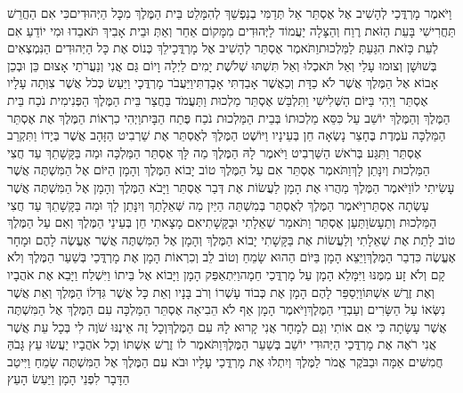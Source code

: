\documentclass[../main/main.tex]{subfiles}
\begin{document}
\begin{multicols}{\ncols}
וַיֹּאמֶר מָרְדֳּכַי לְהָשִׁיב אֶל אֶסְתֵּר אַל תְּדַמִּי בְנַפְשֵׁךְ לְהִמָּלֵט בֵּית הַמֶּלֶךְ מִכָּל הַיְּהוּדִים\PreVerseSpace{}כִּי אִם הַחֲרֵשׁ תַּחֲרִישִׁי בָּעֵת הַזֹּאת רֶוַח וְהַצָּלָה יַעֲמוֹד לַיְּהוּדִים מִמָּקוֹם אַחֵר וְאַתְּ וּבֵית אָבִיךְ תֹּאבֵדוּ וּמִי יוֹדֵעַ אִם לְעֵת כָּזֹאת הִגַּעַתְּ לַמַּלְכוּת\PreVerseSpace{}וַתֹּאמֶר אֶסְתֵּר לְהָשִׁיב אֶל מָרְדֳּכָי\PreVerseSpace{}לֵךְ כְּנוֹס אֶת כָּל הַיְּהוּדִים הַנִּמְצְאִים בְּשׁוּשָׁן וְצוּמוּ עָלַי וְאַל תֹּאכְלוּ וְאַל תִּשְׁתּוּ שְׁלֹשֶׁת יָמִים לַיְלָה וָיוֹם גַּם אֲנִי וְנַעֲרֹתַי אָצוּם כֵּן וּבְכֵן אָבוֹא אֶל הַמֶּלֶךְ אֲשֶׁר לֹא כַדָּת וְכַאֲשֶׁר אָבַדְתִּי אָבָדְתִּי\PreVerseSpace{}וַיַּעֲבֹר מָרְדֳּכָי וַיַּעַשׂ כְּכֹל אֲשֶׁר צִוְּתָה עָלָיו אֶסְתֵּר \ClosedSection{}וַיְהִי בַּיּוֹם הַשְּׁלִישִׁי וַתִּלְבַּשׁ אֶסְתֵּר מַלְכוּת וַתַּעֲמֹד בַּחֲצַר בֵּית הַמֶּלֶךְ הַפְּנִימִית נֹכַח בֵּית הַמֶּלֶךְ וְהַמֶּלֶךְ יוֹשֵׁב עַל כִּסֵּא מַלְכוּתוֹ בְּבֵית הַמַּלְכוּת נֹכַח פֶּתַח הַבָּיִת\PreVerseSpace{}וַיְהִי כִרְאוֹת הַמֶּלֶךְ אֶת אֶסְתֵּר הַמַּלְכָּה עֹמֶדֶת בֶּחָצֵר נָשְׂאָה חֵן בְּעֵינָיו וַיּוֹשֶׁט הַמֶּלֶךְ לְאֶסְתֵּר אֶת שַׁרְבִיט הַזָּהָב אֲשֶׁר בְּיָדוֹ וַתִּקְרַב אֶסְתֵּר וַתִּגַּע בְּרֹאשׁ הַשַּׁרְבִיט \ClosedSection{}וַיֹּאמֶר לָהּ הַמֶּלֶךְ מַה לָּךְ אֶסְתֵּר הַמַּלְכָּה וּמַה בַּקָּשָׁתֵךְ עַד חֲצִי הַמַּלְכוּת וְיִנָּתֵן לָךְ\PreVerseSpace{}וַתֹּאמֶר אֶסְתֵּר אִם עַל הַמֶּלֶךְ טוֹב יָבוֹא הַמֶּלֶךְ וְהָמָן הַיּוֹם אֶל הַמִּשְׁתֶּה אֲשֶׁר עָשִׂיתִי לוֹ\PreVerseSpace{}וַיֹּאמֶר הַמֶּלֶךְ מַהֲרוּ אֶת הָמָן לַעֲשׂוֹת אֶת דְּבַר אֶסְתֵּר וַיָּבֹא הַמֶּלֶךְ וְהָמָן אֶל הַמִּשְׁתֶּה אֲשֶׁר עָשְׂתָה אֶסְתֵּר\PreVerseSpace{}וַיֹּאמֶר הַמֶּלֶךְ לְאֶסְתֵּר בְּמִשְׁתֵּה הַיַּיִן מַה שְּׁאֵלָתֵךְ וְיִנָּתֵן לָךְ וּמַה בַּקָּשָׁתֵךְ עַד חֲצִי הַמַּלְכוּת וְתֵעָשׂ\PreVerseSpace{}וַתַּעַן אֶסְתֵּר וַתֹּאמַר שְׁאֵלָתִי וּבַקָּשָׁתִי\PreVerseSpace{}אִם מָצָאתִי חֵן בְּעֵינֵי הַמֶּלֶךְ וְאִם עַל הַמֶּלֶךְ טוֹב לָתֵת אֶת שְׁאֵלָתִי וְלַעֲשׂוֹת אֶת בַּקָּשָׁתִי יָבוֹא הַמֶּלֶךְ וְהָמָן אֶל הַמִּשְׁתֶּה אֲשֶׁר אֶעֱשֶׂה לָהֶם וּמָחָר אֶעֱשֶׂה כִּדְבַר הַמֶּלֶךְ\PreVerseSpace{}וַיֵּצֵא הָמָן בַּיּוֹם הַהוּא שָׂמֵחַ וְטוֹב לֵב וְכִרְאוֹת הָמָן אֶת מָרְדֳּכַי בְּשַׁעַר הַמֶּלֶךְ וְלֹא קָם וְלֹא זָע מִמֶּנּוּ וַיִּמָּלֵא הָמָן עַל מָרְדֳּכַי חֵמָה\PreVerseSpace{}וַיִּתְאַפַּק הָמָן וַיָּבוֹא אֶל בֵּיתוֹ וַיִּשְׁלַח וַיָּבֵא אֶת אֹהֲבָיו וְאֶת זֶרֶשׁ אִשְׁתּוֹ\PreVerseSpace{}וַיְסַפֵּר לָהֶם הָמָן אֶת כְּבוֹד עָשְׁרוֹ וְרֹב בָּנָיו וְאֵת כָּל אֲשֶׁר גִּדְּלוֹ הַמֶּלֶךְ וְאֵת אֲשֶׁר נִשְּׂאוֹ עַל הַשָּׂרִים וְעַבְדֵי הַמֶּלֶךְ\PreVerseSpace{}וַיֹּאמֶר הָמָן אַף לֹא הֵבִיאָה אֶסְתֵּר הַמַּלְכָּה עִם הַמֶּלֶךְ אֶל הַמִּשְׁתֶּה אֲשֶׁר עָשָׂתָה כִּי אִם אוֹתִי וְגַם לְמָחָר אֲנִי קָרוּא לָהּ עִם הַמֶּלֶךְ\PreVerseSpace{}וְכָל זֶה אֵינֶנּוּ שֹׁוֶה לִי בְּכָל עֵת אֲשֶׁר אֲנִי רֹאֶה אֶת מָרְדֳּכַי הַיְּהוּדִי יוֹשֵׁב בְּשַׁעַר הַמֶּלֶךְ\PreVerseSpace{}וַתֹּאמֶר לוֹ זֶרֶשׁ אִשְׁתּוֹ וְכָל אֹהֲבָיו יַעֲשׂוּ עֵץ גָּבֹהַּ חֲמִשִּׁים אַמָּה וּבַבֹּקֶר אֱמֹר לַמֶּלֶךְ וְיִתְלוּ אֶת מָרְדֳּכַי עָלָיו וּבֹא עִם הַמֶּלֶךְ אֶל הַמִּשְׁתֶּה שָׂמֵחַ וַיִּיטַב הַדָּבָר לִפְנֵי הָמָן וַיַּעַשׂ הָעֵץ\OpenSection{}\par

\end{multicols}
\end{document}
